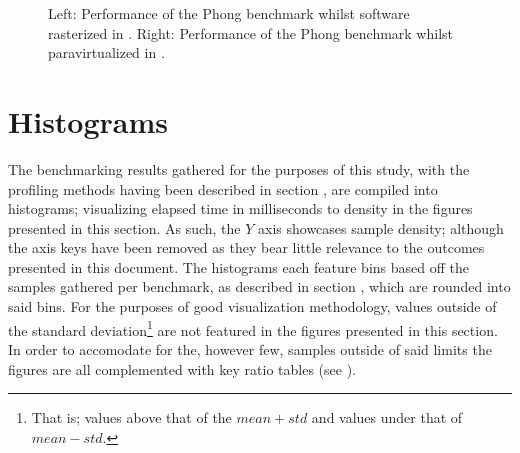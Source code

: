 \begin{sidewaysfigure}
\begin{center}
	

    \label{fig:results_simicsparaphonghistograms}
    \caption{Left: Performance of the Phong benchmark whilst software rasterized in \dvttermsimics . Right: Performance of the Phong benchmark whilst paravirtualized in \dvttermsimics .}
\end{center}
\end{sidewaysfigure}

\section{Histograms}
\label{sec:histograms}
The benchmarking results gathered for the purposes of this study, with the profiling methods having been described in section , are compiled into histograms; visualizing elapsed time in milliseconds to density in the figures presented in this section.
As such, the $Y$ axis showcases sample density; although the axis keys have been removed as they bear little relevance to the outcomes presented in this document.
The histograms each feature  bins based off the  samples gathered per benchmark, as described in section , which are rounded into said bins.
For the purposes of good visualization methodology, values outside of the standard deviation\footnote{That is; values above that of the $mean + std$ and values under that of $mean - std$.} are not featured in the figures presented in this section.
In order to accomodate for the, however few, samples outside of said limits the figures are all complemented with key ratio tables (see  ).